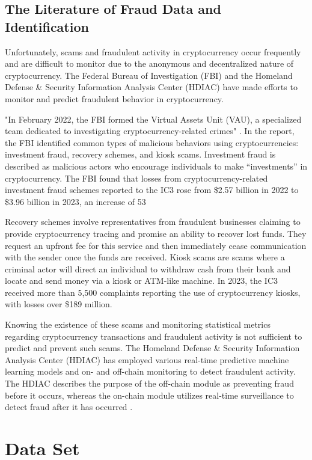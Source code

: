\documentclass[sigconf]{acmart}
\begin{document}
\subsection{The Literature of Fraud Data and Identification}
Unfortunately, scams and fraudulent activity in cryptocurrency occur frequently and are difficult to monitor due to the anonymous and decentralized nature of cryptocurrency. The Federal Bureau of Investigation (FBI) and the Homeland Defense \& Security Information Analysis Center (HDIAC) have made efforts to monitor and predict fraudulent behavior in cryptocurrency.

"In February 2022, the FBI formed the Virtual Assets Unit (VAU), a specialized team dedicated to investigating cryptocurrency-related crimes" \cite{FBI2023}. In the report, the FBI identified common types of malicious behaviors using cryptocurrencies: investment fraud, recovery schemes, and kiosk scams. Investment fraud is described as malicious actors who encourage individuals to make “investments” in cryptocurrency. The FBI found that losses from cryptocurrency-related investment fraud schemes reported to the IC3 rose from \$2.57 billion in 2022 to \$3.96 billion in 2023, an increase of 53%

Recovery schemes involve representatives from fraudulent businesses claiming to provide cryptocurrency tracing and promise an ability to recover lost funds. They request an upfront fee for this service and then immediately cease communication with the sender once the funds are received. Kiosk scams are scams where a criminal actor will direct an individual to withdraw cash from their bank and locate and send money via a kiosk or ATM-like machine. In 2023, the IC3 received more than 5,500 complaints reporting the use of cryptocurrency kiosks, with losses over \$189 million.

Knowing the existence of these scams and monitoring statistical metrics regarding cryptocurrency transactions and fraudulent activity is not sufficient to predict and prevent such scams. The Homeland Defense \& Security Information Analysis Center (HDIAC) has employed various real-time predictive machine learning models and on- and off-chain monitoring to detect fraudulent activity. The HDIAC describes the purpose of the off-chain module as preventing fraud before it occurs, whereas the on-chain module utilizes real-time surveillance to detect fraud after it has occurred \cite{HDIAC2023}.


\section{Data Set}
\end{document}
